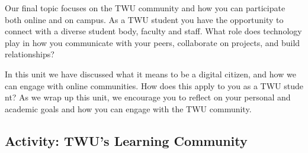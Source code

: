 \documentclass[
]{book}
\theoremstyle{definition}
\theoremstyle{definition}
\theoremstyle{definition}
\theoremstyle{definition}
\theoremstyle{remark}
\begin{document}
Our final topic focuses on the TWU community and how you can participate both online and on campus. As a TWU student you have the opportunity to connect with a diverse student body, faculty and staff. What role does technology play in how you communicate with your peers, collaborate on projects, and build relationships?

In this unit we have discussed what it means to be a digital citizen, and how we can engage with online communities. How does this apply to you as a TWU stude
nt? As we wrap up this unit, we encourage you to reflect on your personal and academic goals and how you can engage with the TWU community.

\hypertarget{activity-twus-learning-community}{%
\subsection*{Activity: TWU's Learning Community}\label{activity-twus-learning-community}}
\end{document}
